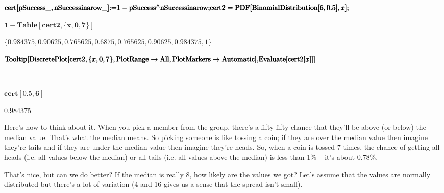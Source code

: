 \documentclass{article}
\begin{document}
\begin{doublespace}
\noindent\(\pmb{\text{cert}[\text{pSuccess$\_$} , \text{nSuccessinarow$\_$}]\text{:=} 1 - \text{pSuccess}{}^{\wedge}\text{nSuccessinarow};}\\
\pmb{\text{cert2} = \text{PDF}[\text{BinomialDistribution}[6, 0.5],x];}\)
\end{doublespace}

\begin{doublespace}
\noindent\(\pmb{1-\text{Table}[\text{cert2}, \{x,0,7\}]}\)
\end{doublespace}

\begin{doublespace}
\noindent\(\{0.984375,0.90625,0.765625,0.6875,0.765625,0.90625,0.984375,1\}\)
\end{doublespace}

\begin{doublespace}
\noindent\(\pmb{\text{Tooltip}[\text{DiscretePlot}[\text{cert2}, \{x,0,7\},\text{PlotRange}\to \text{All}, \text{PlotMarkers}\to \text{Automatic}],
}\\
\pmb{\text{Evaluate}[\text{cert2}[x]]]}\)
\end{doublespace}

\begin{doublespace}
\noindent\(\)
\end{doublespace}

\begin{doublespace}
\noindent\(\pmb{\text{cert}[0.5,6]}\)
\end{doublespace}

\begin{doublespace}
\noindent\(0.984375\)
\end{doublespace}

Here{'}s how to think about it. When you pick a member from the group, there{'}s a fifty-fifty chance that they{'}ll be above (or below) the median
value. That{'}s what the median means. So picking someone is like tossing a coin; if they are over the median value then imagine they{'}re tails
and if they are under the median value then imagine they{'}re heads. So, when a coin is tossed 7 times, the chance of getting all heads (i.e. all
values below the median) or all tails (i.e. all values above the median) is less than 1$\%$ -- it{'}s about 0.78$\%$. 

That{'}s nice, but can we do better? If the median is really 8, how likely are the values we got? Let{'}s assume that the values are normally distributed
but there{'}s a lot of variation (4 and 16 gives us a sense that the spread isn{'}t small). { }
\end{document}
